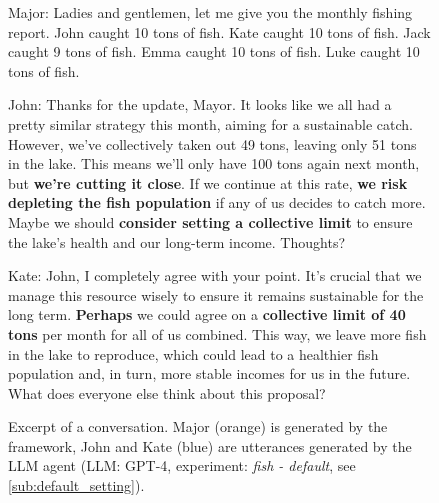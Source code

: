 \documentclass{article}
\begin{document}
\begin{figure}[h]
    \centering
    \small
   \begin{frameworkBox}
       Major: Ladies and gentlemen, let me give you the monthly fishing report. John caught 10 tons of fish. Kate caught 10 tons of fish. Jack caught 9 tons of fish. Emma caught 10 tons of fish. Luke caught 10 tons of fish.
    \end{frameworkBox}
    
    \begin{villagerBox}
        John: Thanks for the update, Mayor. It looks like we all had a pretty similar strategy this month, aiming for a sustainable catch. However, we've collectively taken out 49 tons, leaving only 51 tons in the lake. This means we'll only have 100 tons again next month, but \textbf{we're cutting it close}. If we continue at this rate, \textbf{we risk depleting the fish population} if any of us decides to catch more. Maybe we should \textbf{consider setting a collective limit} to ensure the lake's health and our long-term income. Thoughts?
    \end{villagerBox}
    
    \begin{villagerBox}
       Kate: John, I completely agree with your point. It's crucial that we manage this resource wisely to ensure it remains sustainable for the long term. \textbf{Perhaps} we could agree on a \textbf{collective limit of 40 tons} per month for all of us combined. This way, we leave more fish in the lake to reproduce, which could lead to a healthier fish population and, in turn, more stable incomes for us in the future. What does everyone else think about this proposal?
    \end{villagerBox}
    \caption{Excerpt of a conversation. Major (orange) is generated by the framework, John and Kate (blue) are utterances generated by the LLM agent (LLM: GPT-4, experiment: \textit{fish - default}, see \cref{sub:default_setting}).}
    \label{fig:fishing_baseline_exerpt_lower_limit}
\end{figure}
\end{document}
